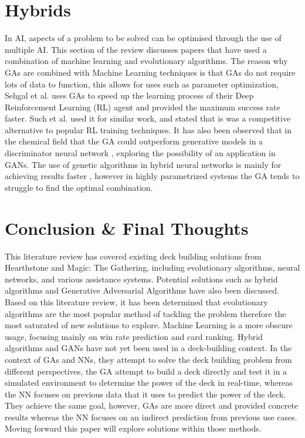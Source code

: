 \documentclass{report} %
\begin{document}
\section{Hybrids}
In AI, aspects of a problem to be solved can be optimised through the use of multiple AI. This section of the review discusses papers that have used a combination of machine learning and evolutionary algorithms. The reason why GAs are combined with Machine Learning techniques is that GAs do not require lots of data to function, this allows for uses such as parameter optimization, Sehgal et al.\cite{Sehgal2019} uses GAs to speed up the learning process of their Deep Reinforcement Learning (RL) agent and provided the maximum success rate faster. Such et al. \cite{Such2017} used it for similar work, and stated that is was a competitive alternative to popular RL training techniques. It has also been observed that in the chemical field that the GA could outperform generative models in a discriminator neural network \cite{Nigam2019}, exploring the possibility of an application in GANs. The use of genetic algorithms in hybrid neural networks is mainly for achieving results faster \cite{Sehgal2019}\cite{Such2017}, however in highly parametrized systems the GA tends to struggle to find the optimal combination. \cite{Janikow1993}

\section{Conclusion \& Final Thoughts}
This literature review has covered existing deck building solutions from Hearthstone and Magic: The Gathering, including evolutionary algorithms, neural networks, and various assistance systems. Potential solutions such as hybrid algorithms and Generative Adversarial Algorithms have also been discussed. Based on this literature review, it has been determined that evolutionary algorithms are the most popular method of tackling the problem therefore the most saturated of new solutions to explore. Machine Learning is a more obscure usage, focusing mainly on win rate prediction and card ranking. Hybrid algorithms and GANs have not yet been used in a deck-building context. In the context of GAs and NNs, they attempt to solve the deck building problem from different perspectives, the GA attempt to build a deck directly and test it in a simulated environment to determine the power of the deck in real-time, whereas the NN focuses on previous data that it uses to predict the power of the deck. They achieve the same goal, however, GAs are more direct and provided concrete results whereas the NN focuses on an indirect prediction from previous use cases. Moving forward this paper will explore solutions within those methods.
\end{document}
